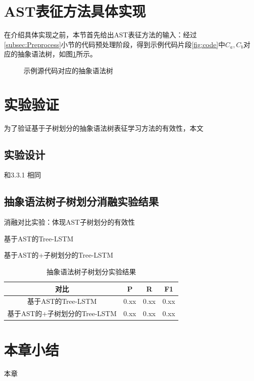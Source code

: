 \section{AST表征方法具体实现}
\label{sec:achieve}

在介绍具体实现之前，本节首先给出AST表征方法的输入：经过\ref{subsec:Preprocess}小节的代码预处理阶段，得到示例代码片段\ref{fig:code}中$C_{a},C_{b}$对应的抽象语法树，如图\ref{fig:astcode}所示。
\begin{figure}[htbp]
  \centering  %
  \qquad
  \caption{示例源代码对应的抽象语法树}    %
  \label{fig:astcode}    %
\end{figure}

\section{实验验证}
为了验证基于子树划分的抽象语法树表征学习方法的有效性，本文
\subsection{实验设计}
和3.3.1 相同
\subsection{抽象语法树子树划分消融实验结果}
消融对比实验：体现AST子树划分的有效性

基于AST的Tree-LSTM

基于AST的+子树划分的Tree-LSTM

\begin{table}
  \centering
  \caption{抽象语法树子树划分实验结果} %
  \begin{tabular*}{0.9\textwidth}{@{\extracolsep{\fill}}cccc}
  \toprule
    对比			&P		&R		&F1 \\
  \midrule
    基于AST的Tree-LSTM			&0.xx	&0.xx		&0.xx \\
    基于AST的+子树划分的Tree-LSTM			&0.xx		&0.xx		&0.xx \\
  \bottomrule
  \end{tabular*}
\end{table}

\section{本章小结}
本章



